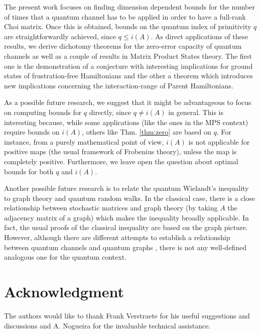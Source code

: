 \documentclass[journal,twoside]{IEEEtran}
\newcommand{\1}{\mathbbm{1}}
\renewcommand{\>}{\rangle}
\newcommand{\<}{\langle}
\begin{document}
The present work focuses on finding dimension dependent bounds
for the number of times that a quantum channel has to be applied in
order to have a full-rank Choi matrix. Once this is obtained, bounds
on the quantum index of primitivity $q$ are straightforwardly
achieved, since $q \leq i(A)$. As direct applications of these
results, we derive dichotomy theorems for the zero-error capacity of
quantum channels as well as a couple of results in Matrix Product
States theory. The first one is the demonstration of a conjecture
with interesting implications for ground states of frustration-free
Hamiltonians and the other a theorem which introduces new
implications concerning the interaction-range of Parent
Hamiltonians.

As a possible future research, we suggest that it might be
advantageous to focus on computing bounds for $q$ directly, since $q
\neq i(A)$ in general. This is interesting because, while some
applications (like the ones in the MPS context) require bounds on
$i(A)$, others like Thm. \ref{thm:zero} are based on $q$. For
instance, from a purely mathematical point of view, $i(A)$ is not
applicable for positive maps (the usual framework of Frobenius
theory), unless the map is completely positive. Furthermore, we
leave  open the question about optimal bounds for both $q$ and
$i(A)$.

Another possible future research is to relate the quantum Wielandt's
inequality to graph theory and quantum random walks. In the
classical case, there is a close relationship between stochastic
matrices and graph theory (by taking $A$ the adjacency matrix of a
graph) which makes the inequality broadly applicable. In fact, the
usual proofs of the classical inequality are based on the graph
picture. However, although there are different attempts to establish
a relationship between quantum channels and quantum graphs
\cite{Kempe,BT07}, there is not any well-defined analogous one for
the quantum context.


\section*{Acknowledgment}


The authors would like to thank Frank Verstraete for his useful suggestions and discussions and A. Nogueira for the invaluable technical assistance. 


\ifCLASSOPTIONcaptionsoff
  \newpage
\fi
\end{document}
